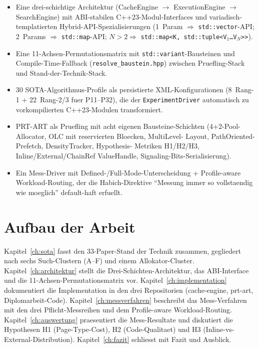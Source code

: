 \begin{itemize}
    \item Eine drei-schichtige Architektur (CacheEngine $\to$
          ExecutionEngine $\to$ SearchEngine) mit ABI-stabilen
          C++23-Modul-Interfaces und variadisch-templatierten
          Hybrid-API-Spezialisierungen (1~Param $\Rightarrow$
          \texttt{std::vector}-API; 2~Params $\Rightarrow$
          \texttt{std::map}-API; $N>2 \Rightarrow$
          \texttt{std::map<K, std::tuple<V$_1$\ldots V$_N$>>}).

    \item Eine 11-Achsen-Permutationsmatrix mit
          \texttt{std::variant}-Bausteinen und Compile-Time-Fallback
          (\texttt{resolve\_baustein.hpp}) zwischen Pruefling-Stack und
          Stand-der-Technik-Stack.

    \item 30 SOTA-Algorithmus-Profile als persistierte XML-Konfigurationen
          (8~Rang-1 + 22~Rang-2/3 fuer P11--P32), die der
          \texttt{ExperimentDriver} automatisch zu vorkompilierten
          C++23-Modulen transformiert.

    \item PRT-ART als Pruefling mit acht eigenen Bausteine-Schichten
          (4+2-Pool-Allocator, OLC mit reservierten Bloecken, MultiLevel-
          Layout, PathOriented-Prefetch, DensityTracker, Hypothesis-
          Metriken H1/H2/H3, Inline/External/ChainRef ValueHandle,
          Signaling-Bits-Serialisierung).

    \item Ein Mess-Driver mit Defined-/Full-Mode-Unterscheidung +
          Profile-aware Workload-Routing, der die Habich-Direktive
          ``Messung immer so vollstaendig wie moeglich'' default-haft
          erfuellt.
\end{itemize}

\section{Aufbau der Arbeit}

Kapitel~\ref{ch:sota} fasst den 33-Paper-Stand der Technik zusammen,
gegliedert nach sechs Such-Clustern (A--F) und einem Allokator-Cluster.
Kapitel~\ref{ch:architektur} stellt die Drei-Schichten-Architektur,
das ABI-Interface und die 11-Achsen-Permutationsmatrix vor.
Kapitel~\ref{ch:implementation} dokumentiert die Implementation in den
drei Repositorien (cache-engine, prt-art, Diplomarbeit-Code).
Kapitel~\ref{ch:messverfahren} beschreibt das Mess-Verfahren mit den
drei Pflicht-Messreihen und dem Profile-aware Workload-Routing.
Kapitel~\ref{ch:auswertung} praesentiert die Mess-Resultate und
diskutiert die Hypothesen H1 (Page-Type-Cost), H2 (Code-Qualitaet) und
H3 (Inline-vs-External-Distribution). Kapitel~\ref{ch:fazit} schliesst
mit Fazit und Ausblick.
